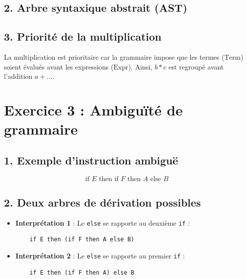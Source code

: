 \documentclass[12pt]{article}
\begin{document}
\subsection*{2. Arbre syntaxique abstrait (AST)}

\subsection*{3. Priorité de la multiplication}
La multiplication est prioritaire car la grammaire impose que les termes (\(\text{Term}\)) soient évalués avant les expressions (\(\text{Expr}\)). Ainsi, \(b * c\) est regroupé avant l'addition \(a + \ldots\).

\section*{Exercice 3 : Ambiguïté de grammaire}

\subsection*{1. Exemple d'instruction ambiguë}
\[
\text{if } E \text{ then if } F \text{ then } A \text{ else } B
\]

\subsection*{2. Deux arbres de dérivation possibles}
\begin{itemize}
    \item \textbf{Interprétation 1} : Le \texttt{else} se rapporte au deuxième \texttt{if} :
    \begin{verbatim}
    if E then (if F then A else B)
    \end{verbatim}
    
    \item \textbf{Interprétation 2} : Le \texttt{else} se rapporte au premier \texttt{if} :
    \begin{verbatim}
    if E then (if F then A) else B
    \end{verbatim}
\end{itemize}
\end{document}
